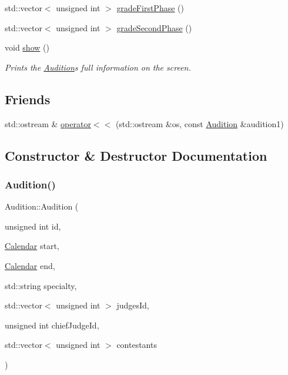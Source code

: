 \begin{DoxyCompactItemize}
std\+::vector$<$ unsigned int $>$ \hyperlink{class_audition_a608be9eeff1801eaa956d6d831c8085f}{grade\+First\+Phase} ()
\item 
std\+::vector$<$ unsigned int $>$ \hyperlink{class_audition_a78dc27847791ceac4524268ce059b832}{grade\+Second\+Phase} ()
\item 
\mbox{\label{class_audition_a01582041dd15068e976e069d87a3b440}} 
void \hyperlink{class_audition_a01582041dd15068e976e069d87a3b440}{show} ()
\begin{DoxyCompactList}\small\item\em Prints the \hyperlink{class_audition}{Audition}\textquotesingle{}s full information on the screen. \end{DoxyCompactList}\end{DoxyCompactItemize}
\subsection*{Friends}
\begin{DoxyCompactItemize}
\item 
std\+::ostream \& \hyperlink{class_audition_a67ea98e4a54230ec3836fea39695ff8d}{operator$<$$<$} (std\+::ostream \&os, const \hyperlink{class_audition}{Audition} \&audition1)
\end{DoxyCompactItemize}


\subsection{Constructor \& Destructor Documentation}
\mbox{\label{class_audition_aba9121b34d5f4064cefee6afa099bfa8}} 
\subsubsection{\texorpdfstring{Audition()}{Audition()}\hspace{0.1cm}{\footnotesize\ttfamily [1/2]}}
{\footnotesize\ttfamily Audition\+::\+Audition (\begin{DoxyParamCaption}\item[{unsigned int}]{id,  }\item[{\hyperlink{class_calendar}{Calendar}}]{start,  }\item[{\hyperlink{class_calendar}{Calendar}}]{end,  }\item[{std\+::string}]{specialty,  }\item[{std\+::vector$<$ unsigned int $>$}]{judges\+Id,  }\item[{unsigned int}]{chief\+Judge\+Id,  }\item[{std\+::vector$<$ unsigned int $>$}]{contestants }\end{DoxyParamCaption})}



